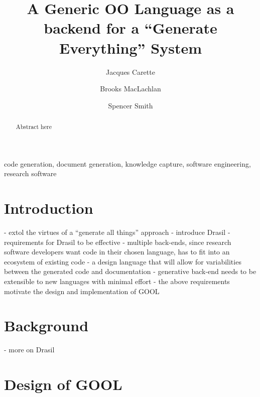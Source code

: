 \documentclass[review]{elsarticle}
\begin{document}
\begin{frontmatter}

\title[Generate Everything]{A Generic OO Language as a backend for a
  ``Generate Everything'' System}

\author[mymainaddress]{Jacques Carette}

\author[mysecondaryaddress]{Brooks MacLachlan}

\author[mymainaddress]{Spencer Smith}

\address[mymainaddress]{Computing and Software, McMaster University}
\address[mysecondaryaddress]{Brooke's address}

\begin{abstract}
Abstract here
\end{abstract}

\begin{keyword}
code generation, document generation, knowledge capture,
  software engineering, research software
\end{keyword}

\end{frontmatter}

\linenumbers

\section{Introduction}

- extol the virtues of a “generate all things” approach
- introduce Drasil
- requirements for Drasil to be effective
	- multiple back-ends, since research software developers want code in
        their chosen language, has to fit into an ecosystem of existing code
	- a design language that will allow for variabilities between the
        generated code and documentation
	- generative back-end needs to be extensible to new languages with
        minimal effort
- the above requirements motivate the design and implementation of GOOL

\section{Background}

- more on Drasil

\section{Design of GOOL}
\end{document}
